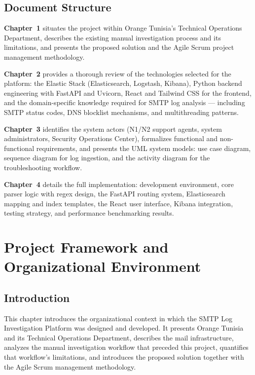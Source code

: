\documentclass[12pt,a4paper,oneside]{report}
\begin{document}
\section*{Document Structure}
{}

\textbf{Chapter~1} situates the project within Orange Tunisia's Technical Operations Department, describes the existing manual investigation process and its limitations, and presents the proposed solution and the Agile Scrum project management methodology.

\textbf{Chapter~2} provides a thorough review of the technologies selected for the platform: the Elastic Stack (Elasticsearch, Logstash, Kibana), Python backend engineering with FastAPI and Uvicorn, React and Tailwind CSS for the frontend, and the domain-specific knowledge required for SMTP log analysis --- including SMTP status codes, DNS blocklist mechanisms, and multithreading patterns.

\textbf{Chapter~3} identifies the system actors (N1/N2 support agents, system administrators, Security Operations Center), formalizes functional and non-functional requirements, and presents the UML system models: use case diagram, sequence diagram for log ingestion, and the activity diagram for the troubleshooting workflow.

\textbf{Chapter~4} details the full implementation: development environment, core parser logic with regex design, the FastAPI routing system, Elasticsearch mapping and index templates, the React user interface, Kibana integration, testing strategy, and performance benchmarking results.

\chapter{Project Framework and Organizational Environment}

\section{Introduction}

This chapter introduces the organizational context in which the SMTP Log Investigation Platform was designed and developed.
It presents Orange Tunisia and its Technical Operations Department, describes the mail infrastructure, analyzes the manual investigation workflow that preceded this project, quantifies that workflow's limitations, and introduces the proposed solution together with the Agile Scrum management methodology.
\end{document}
